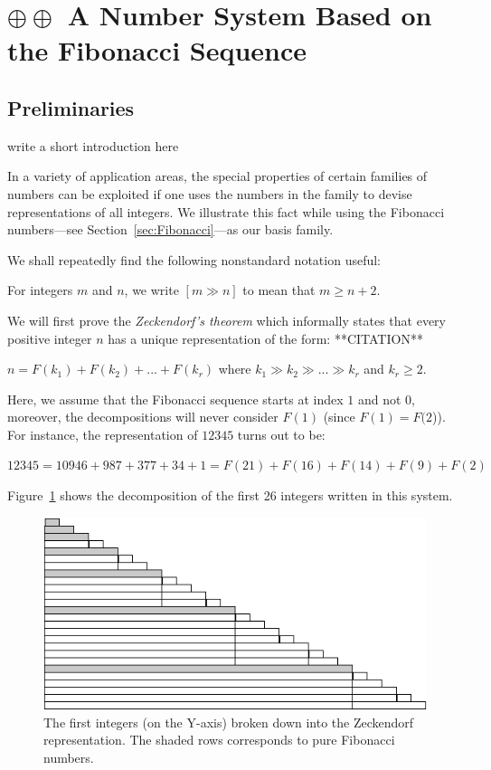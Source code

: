 \section{$\oplus \oplus$ A Number System Based on the Fibonacci Sequence}
\label{sec:numerals-special-families}
\label{sec:Fibo-numbers}


\subsection{Preliminaries}
{\Denis write a short introduction here}

In a variety of application areas, the special properties of certain
families of numbers can be exploited if one uses the numbers in the
family to devise representations of all integers.  We illustrate this
fact while using the Fibonacci numbers---see
Section~\ref{sec:Fibonacci}---as our basis family.

We shall repeatedly find the following nonstandard notation useful:

For integers $m$ and $n$, we write $[m \gg n]$ to mean that $m \geq
n+2$.

\medskip


We will first prove the \textit{Zeckendorf's theorem} which informally states
that every positive integer $n$ has a unique representation of the
form:  **CITATION**

$n = F(k_1) + F(k_2) + ... + F(k_r)$ where $k_1 \gg k_2 \gg ... \gg k_r$ and $k_r \geq 2$.

Here, we assume that the Fibonacci sequence starts at index $1$ and not $0$,
moreover, the decompositions will never consider $F(1)$ (since $F(1)=F(2$)). 
For instance, the representation of $12345$ turns out to be:

$12345 = 10946 + 987 + 377 + 34 + 1 = F(21) + F(16) + F(14) + F(9) + F(2)$
\bigskip

Figure~\ref{zeckendorf} shows the decomposition of the first 26 integers written in this system. 
\begin{figure}[h]
\begin{center}
        \includegraphics[scale=0.6]{FiguresArithmetic/Zeckendorf}
        \caption{The first integers (on the Y-axis) broken down into the Zeckendorf representation.
        The shaded rows corresponds to pure Fibonacci numbers.}
\label{zeckendorf}
\end{center}
\end{figure}

